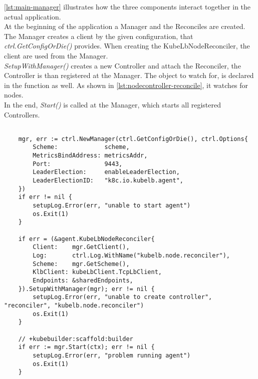 \newpage

\autoref{lst:main-manager} illustrates how the three components interact together in the actual application.
\\
At the beginning of the application a Manager and the Reconciles are created.
The Manager creates a client by the given configuration, that \textit{ctrl.GetConfigOrDie()} provides.
When creating the KubeLbNodeReconciler, the client are used from the Manager.
\\
\textit{SetupWithManager()} creates a new Controller and attach the Reconciler, the Controller is than registered at the Manager.
The object to watch for, is declared in the function as well.
As shown in \autoref{lst:nodecontroller-reconcile}, it watches for nodes.
\\
In the end, \textit{Start()} is called at the Manager, which starts all registered Controllers.

\begin{lstlisting}[caption={KubeLB Agent main.go snippet - Manager and Controller}, label={lst:main-manager}]

	mgr, err := ctrl.NewManager(ctrl.GetConfigOrDie(), ctrl.Options{
		Scheme:             scheme,
		MetricsBindAddress: metricsAddr,
		Port:               9443,
		LeaderElection:     enableLeaderElection,
		LeaderElectionID:   "k8c.io.kubelb.agent",
	})
	if err != nil {
		setupLog.Error(err, "unable to start agent")
		os.Exit(1)
	}

	if err = (&agent.KubeLbNodeReconciler{
		Client:    mgr.GetClient(),
		Log:       ctrl.Log.WithName("kubelb.node.reconciler"),
		Scheme:    mgr.GetScheme(),
		KlbClient: kubeLbClient.TcpLbClient,
		Endpoints: &sharedEndpoints,
	}).SetupWithManager(mgr); err != nil {
		setupLog.Error(err, "unable to create controller", "reconciler", "kubelb.node.reconciler")
		os.Exit(1)
	}

	// +kubebuilder:scaffold:builder
	if err := mgr.Start(ctx); err != nil {
		setupLog.Error(err, "problem running agent")
		os.Exit(1)
	}


\end{lstlisting}

